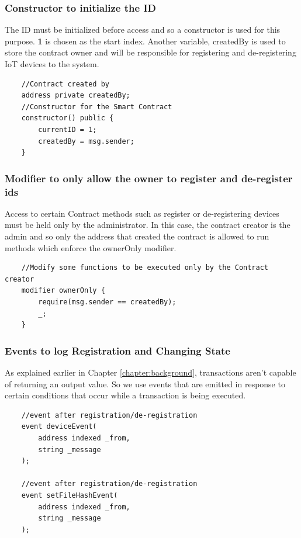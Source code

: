 \documentclass[11pt,openright]{report}
\begin{document}
\subsubsection{Constructor to initialize the ID}
The ID must be initialized before access and so a constructor is used for this purpose. \textbf{1}  is chosen as the start index. Another variable, createdBy is used to store the contract owner and will be responsible for registering and de-registering IoT devices to the system.
\begin{verbatim}
    //Contract created by
    address private createdBy;
    //Constructor for the Smart Contract
    constructor() public {
        currentID = 1;
        createdBy = msg.sender;
    }
\end{verbatim}

\subsubsection{Modifier to only allow the owner to register and de-register ids}
Access to certain Contract methods such as register or de-registering devices must be held only by the administrator. In this case, the contract creator is the admin and so only the address that created the contract is allowed to run methods which enforce the ownerOnly modifier.
\begin{verbatim}
    //Modify some functions to be executed only by the Contract creator
    modifier ownerOnly {
        require(msg.sender == createdBy);
        _;
    }
\end{verbatim}

\subsubsection{Events to log Registration and Changing State}
As explained earlier in Chapter \ref{chapter:background}, transactions aren't capable of returning an output value. So we use events that are emitted in response to certain conditions that occur while a transaction is being executed.

\begin{verbatim}
    //event after registration/de-registration
    event deviceEvent(
        address indexed _from,
        string _message
    );
    
    //event after registration/de-registration
    event setFileHashEvent(
        address indexed _from,
        string _message
    );
\end{verbatim}
\end{document}
